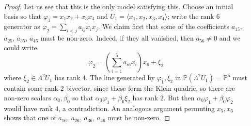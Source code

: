 \documentclass[10pt,reqno]{amsart}
\newcommand{\la}{\langle}
\newcommand{\ra}{\rangle}
\newcommand{\PP}{\mathbb P}
\renewcommand{\a}{\alpha}
\renewcommand{\b}{\beta}
\newcommand{\f}{\varphi}
\renewcommand{\L}{\Lambda}
\theoremstyle{definition}
\begin{document}
\begin{proof}
\item Let us see that this is the only model satisfying this. Choose an initial basis so that $\f_1=x_1x_2+x_3x_4$ and $U_1=\la x_1,x_2,x_3,x_4\ra$; write the rank $6$ generator as $\f_2=\sum_{i<j} a_{ij} x_ix_j$. We claim first that some of the coefficients $a_{15}$, $a_{25}$, $a_{35}$, $a_{45}$ must be non-zero. Indeed, if they all vanished, then $a_{56} \ne 0$ and we could write 
\[
\f_2=(\textstyle{\sum_{i=1}^5 a_{i6} x_i})x_6 + \xi_2
\]
where $\xi_2 \in \L^2 U_1$ has rank $4$. The line generated by $\f_1, \xi_2$ in $\PP(\L^2 U_1)=\PP^5$ must contain some rank-$2$ bivector, since these form the Klein quadric, so there are non-zero scalars $\a_0, \b_0$ so that $\a_0 \f_1+ \b_0 \xi_2$ has rank $2$. But then $\a_0 \f_1+ \b_0 \f_2$ would have rank $4$, a contradiction. An analogous argument permuting $x_5, x_6$ shows that one of $a_{16}$, $a_{26}$, $a_{36}$, $a_{46}$ must be non-zero.


\end{proof}
\end{document}
